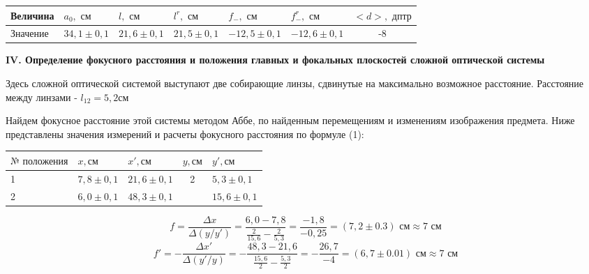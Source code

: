 \documentclass[a4paper,12pt]{report}
\begin{document}
\begin{table}[h!]
\centering
\begin{tabular}{|l|l|l|l|l|l|c|}
\hline
Величина & $a_{0}, \text{ см}$           & $l, \text{ см}$           & $l^{r}, \text{ см}$           & $f_{-}, \text{ см}$            & $f_{-}^{r}, \text{ см}$ & $<d>, \text{ дптр}$          \\ \hline
Значение & $34,1\pm0,1$ & $21,6\pm0,1$ & $21,5\pm0,1$ & $-12,5\pm0,1$ & $-12,6\pm0,1$ & -8 \\ \hline
\end{tabular}
\end{table}

\noindent\textbf{IV. Определение фокусного расстояния и положения главных и
фокальных плоскостей сложной оптической системы}

Здесь сложной оптической системой выступают две собирающие линзы, сдвинутые на максимально возможное расстояние. Расстояние между линзами - $l_{12} = 5,2 \text{см}$

Найдем фокусное расстояние этой системы методом Аббе, по найденным перемещениям и изменениям изображения предмета. Ниже представлены значения измерений и расчеты фокусного расстояния по формуле (1):

\begin{table}[h!]
\centering
\begin{tabular}{|l|l|l|c|l|}
\hline
$\text{№ положения}$ & $x, \text{см}$   & $x', \text{см}$   & \multicolumn{1}{l|}{$y, \text{см}$} & $y', \text{см}$   \\ \hline
1         & $7,8\pm0,1$ & $21,6\pm0,1$ & \multirow{2}{*}{2}     & $5,3\pm0,1$  \\ \cline{1-3} \cline{5-5} 
2         & $6,0\pm0,1$   & $48,3\pm0,1$ &                        & $15,6\pm0,1$ \\ \hline
\end{tabular}
\end{table}

\begin{equation*}
    f = \frac{\Delta x}{\Delta(y/y')} = \frac{6,0 - 7,8}{\frac{2}{15,6} - \frac{2}{5,3}} = \frac{-1,8}{-0,25} = (7,2 \pm 0.3) \text{ см} \approx 7 \text{ см} 
\end{equation*}
\begin{equation*}
    f' = -\frac{\Delta x'}{\Delta(y'/y)} = - \frac{48,3 - 21,6}{\frac{15,6}{2} - \frac{5,3}{2}} = -\frac{26,7}{-4} = (6,7 \pm 0.01) \text{ см} \approx 7 \text{ см}
\end{equation*}
\end{document}
